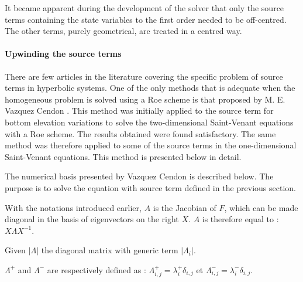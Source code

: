 \vspace{0.5cm}

It became apparent during the development of the solver that only the source terms containing the state variables to the first order needed to be off-centred. The other terms, purely geometrical, are treated in a centred way.

\paragraph{Upwinding the source terms\\} \label{DecenSRC}

\hspace*{1cm}

There are few articles in the literature covering the specific problem of source terms in hyperbolic systems. One of the only methods that is adequate when the homogeneous problem is solved using a Roe scheme is that proposed by M. E. Vazquez Cendon \cite{VAZQUEZ94}. This method was initially applied to the source term for bottom elevation variations to solve the two-dimensional Saint-Venant equations \cite{GOUTAL96} with a Roe scheme. The results obtained were found satisfactory. The same method was therefore applied to some of the source terms in the one-dimensional Saint-Venant equations. This method is presented below in detail.

\vspace{0.5cm}

The numerical basis presented by Vazquez Cendon is described below. The purpose is to solve the equation with source term defined in the previous section.

\vspace{0.5cm}

With the notations introduced earlier, $A$ is the Jacobian of $F$, which can be made diagonal in the basis of eigenvectors on the right $X$. $A$ is therefore equal to : $X \Lambda X^{-1}$.

\vspace{0.5cm}

Given $|\Lambda|$ the diagonal matrix with generic term $|\Lambda_i|$.

\vspace{0.5cm}

$\Lambda^+$ and $\Lambda^-$ are respectively defined as : $\Lambda_{i,j}^+ = \lambda_{i}^+ \delta_{i,j}$ et $\Lambda_{i,j}^- = \lambda_{i}^- \delta_{i,j}$.

\vspace{0.5cm}

